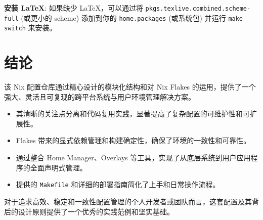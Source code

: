 \documentclass[11pt, a4paper]{article} %
\begin{document}
\textbf{安装 LaTeX}: 如果缺少 LaTeX，可以通过将 \texttt{pkgs.texlive.combined.scheme-full} (或更小的 scheme) 添加到你的 \texttt{home.packages} (或系统包) 并运行 \texttt{make switch} 来安装。

\section{结论}
该 Nix 配置仓库通过精心设计的模块化结构和对 Nix Flakes 的运用，提供了一个强大、灵活且可复现的跨平台系统与用户环境管理解决方案。
    \begin{itemize}
        \item 其清晰的关注点分离和代码复用实践，显著提高了复杂配置的可维护性和可扩展性。
        \item Flakes 带来的显式依赖管理和构建确定性，确保了环境的一致性和可靠性。
        \item 通过整合 Home Manager、Overlays 等工具，实现了从底层系统到用户应用程序的全面声明式管理。
        \item 提供的 \texttt{Makefile} 和详细的部署指南简化了上手和日常操作流程。
    \end{itemize}
对于追求高效、稳定和一致性配置管理的个人开发者或团队而言，这套配置及其背后的设计原则提供了一个优秀的实践范例和坚实基础。

\end{document}
